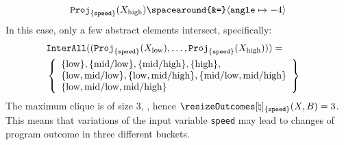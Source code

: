 \begin{example}
\begin{align*}
    \abstractdomainproject[{\{\texttt{speed}\}}](\prefrombucket[\textup{high}]) \spacearound{&=} \langle \texttt{angle} \mapsto -4 \rangle \\
  \end{align*}
  In this case, only a few abstract elements intersect, specifically:
  \begin{eqnarray*}
    \lefteqn{\intersectallfunction((\abstractdomainproject[{\{\texttt{speed}\}}](\prefrombucket[\textup{low}]), \dots, \abstractdomainproject[{\{\texttt{speed}\}}](\prefrombucket[\textup{high}]))) ={}} \\
  & \left\{
    \begin{array}{l}
    \{\textup{low}\}, \{\textup{mid\-/low}\}, \{\textup{mid\-/high}\}, \{\textup{high}\}, \\
    \{\textup{low}, \textup{mid\-/low}\}, \{\textup{low}, \textup{mid\-/high}\},
    \{\textup{mid\-/low}, \textup{mid\-/high}\}\\
    \{\textup{low}, \textup{mid\-/low}, \textup{mid\-/high}\}
    \end{array}
    \right\}
  \end{eqnarray*}
  The maximum clique is of size $3$, \cf{} , hence $\abstractoutcomesname_{\{\texttt{speed}\}}(\presfrombuckets, \buckets) = 3$. This means that variations of the input variable \texttt{speed} may lead to changes of program outcome in three different buckets.
\end{example}

